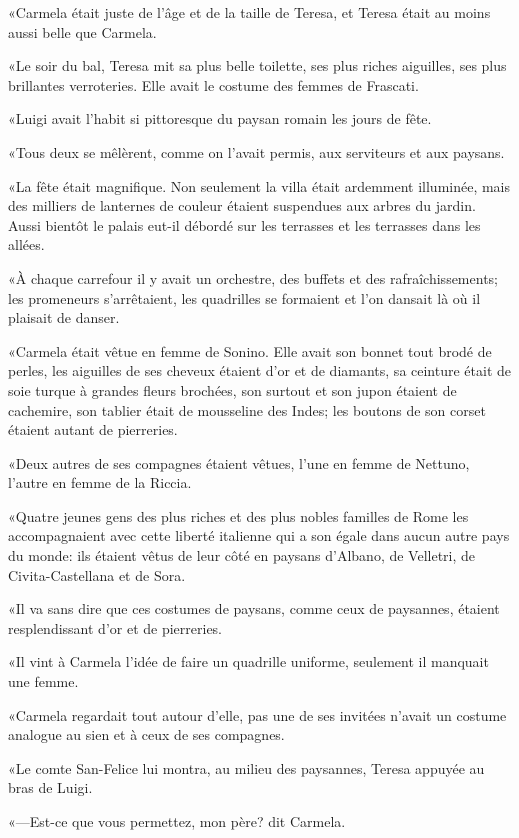 «Carmela était juste de l'âge et de la taille de Teresa, et Teresa était au moins aussi belle que Carmela. 

«Le soir du bal, Teresa mit sa plus belle toilette, ses plus riches aiguilles, ses plus brillantes verroteries. Elle avait le costume des femmes de Frascati. 

«Luigi avait l'habit si pittoresque du paysan romain les jours de fête. 

«Tous deux se mêlèrent, comme on l'avait permis, aux serviteurs et aux paysans. 

«La fête était magnifique. Non seulement la villa était ardemment illuminée, mais des milliers de lanternes de couleur étaient suspendues aux arbres du jardin. Aussi bientôt le palais eut-il débordé sur les terrasses et les terrasses dans les allées. 

«À chaque carrefour il y avait un orchestre, des buffets et des rafraîchissements; les promeneurs s'arrêtaient, les quadrilles se formaient et l'on dansait là où il plaisait de danser. 

«Carmela était vêtue en femme de Sonino. Elle avait son bonnet tout brodé de perles, les aiguilles de ses cheveux étaient d'or et de diamants, sa ceinture était de soie turque à grandes fleurs brochées, son surtout et son jupon étaient de cachemire, son tablier était de mousseline des Indes; les boutons de son corset étaient autant de pierreries. 

«Deux autres de ses compagnes étaient vêtues, l'une en femme de Nettuno, l'autre en femme de la Riccia. 

«Quatre jeunes gens des plus riches et des plus nobles familles de Rome les accompagnaient avec cette liberté italienne qui a son égale dans aucun autre pays du monde: ils étaient vêtus de leur côté en paysans d'Albano, de Velletri, de Civita-Castellana et de Sora. 

«Il va sans dire que ces costumes de paysans, comme ceux de paysannes, étaient resplendissant d'or et de pierreries. 

«Il vint à Carmela l'idée de faire un quadrille uniforme, seulement il manquait une femme. 

«Carmela regardait tout autour d'elle, pas une de ses invitées n'avait un costume analogue au sien et à ceux de ses compagnes. 

«Le comte San-Felice lui montra, au milieu des paysannes, Teresa appuyée au bras de Luigi. 

«—Est-ce que vous permettez, mon père? dit Carmela. 


